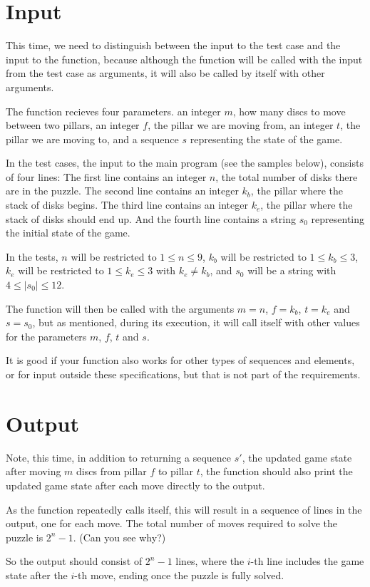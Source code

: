 \section*{Input}

This time, we need to distinguish between the input to the test case
and the input to the function,
because although the function will be called
with the input from the test case as arguments,
it will also be called by itself with other arguments.

The function recieves four parameters.
an integer $m$, how many discs to move between two pillars,
an integer $f$, the pillar we are moving from,
an integer $t$, the pillar we are moving to,
and a sequence $s$ representing the state of the game.

In the test cases, the input to the main program
(see the samples below),
consists of four lines:
The first line contains an integer $n$,
the total number of disks there are in the puzzle.
The second line contains an integer $k_b$,
the pillar where the stack of disks begins.
The third line contains an integer $k_e$,
the pillar where the stack of disks should end up.
And the fourth line contains a string $s_0$
representing the initial state of the game.

In the tests, $n$ will be restricted to $1 \le n \le 9$,
$k_b$ will be restricted to $1 \le k_b \le 3$,
$k_e$ will be restricted to $1 \le k_e \le 3$
with $k_e \ne k_b$,
and $s_0$ will be a string with $4 \le |s_0| \le 12$.

The function will then be called with the arguments
$m=n$, $f=k_b$, $t=k_e$ and $s=s_0$,
but as mentioned, during its execution,
it will call itself with other values for the parameters
$m$, $f$, $t$ and $s$.

It is good if your function also works for other types of sequences and elements,
or for input outside these specifications,
but that is not part of the requirements.

\section*{Output}

Note, this time,
in addition to returning a sequence $s'$,
the updated game state after moving $m$ discs
from pillar $f$ to pillar $t$,
the function should also print
the updated game state after each move
directly to the output.

As the function repeatedly calls itself,
this will result in a sequence of lines in the output,
one for each move.
The total number of moves required to solve the puzzle is $2^n-1$.
(Can you see why?)

So the output should consist of $2^n-1$ lines,
where the $i$-th line includes the game state after the $i$-th move,
ending once the puzzle is fully solved.
